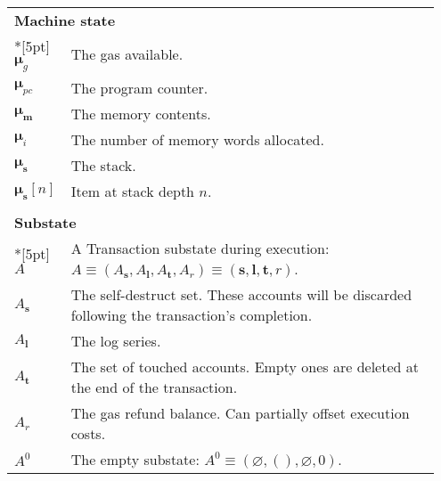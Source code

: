 \documentclass[9pt,oneside]{amsart}
\begin{document}
\begin{longtable}{p{0.10\linewidth}p{0.85\linewidth}}
\vspace{5pt} \\
\midrule
\multicolumn{2}{l}{\textbf{Machine state}} \\*[5pt]
$\boldsymbol{\mu}_g$ & The gas available. \\
$\boldsymbol{\mu}_{pc}$ & The program counter. \\
$\boldsymbol{\mu}_\mathbf{m}$ & The memory contents. \\
$\boldsymbol{\mu}_i$ & The number of memory words allocated. \\
$\boldsymbol{\mu}_\mathbf{s}$ & The stack. \\
$\boldsymbol{\mu}_\mathbf{s}[n]$ & Item at stack depth $n$. \\

\vspace{5pt} \\
\midrule
\multicolumn{2}{l}{\textbf{Substate}} \\*[5pt]
$A$ & A Transaction substate during execution: $A \equiv (A_\mathbf{s}, A_\mathbf{l}, A_\mathbf{t}, A_r) \equiv (\mathbf{s}, \mathbf{l}, \mathbf{t}, r)$. \\
$A_\mathbf{s}$ & The self-destruct set. These accounts will be discarded following the transaction's completion. \\
$A_\mathbf{l}$ & The log series. \\
$A_\mathbf{t}$ & The set of touched accounts. Empty ones are deleted at the end of the transaction.\\
$A_r$ & The gas refund balance. Can partially offset execution costs.\\
$A^0$ & The empty substate: $A^0 \equiv (\varnothing, (), \varnothing, 0)$. \\


\end{longtable}
\end{document}
